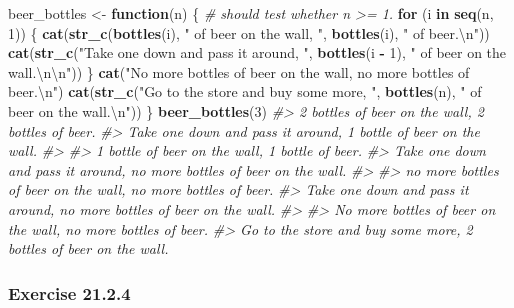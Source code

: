 \documentclass[]{book}
\newenvironment{Shaded}{\begin{snugshade}}{\end{snugshade}}
\newcommand{\CharTok}[1]{\textcolor[rgb]{0.31,0.60,0.02}{#1}}
\newcommand{\CommentTok}[1]{\textcolor[rgb]{0.56,0.35,0.01}{\textit{#1}}}
\newcommand{\ControlFlowTok}[1]{\textcolor[rgb]{0.13,0.29,0.53}{\textbf{#1}}}
\newcommand{\DecValTok}[1]{\textcolor[rgb]{0.00,0.00,0.81}{#1}}
\newcommand{\KeywordTok}[1]{\textcolor[rgb]{0.13,0.29,0.53}{\textbf{#1}}}
\newcommand{\NormalTok}[1]{#1}
\newcommand{\OperatorTok}[1]{\textcolor[rgb]{0.81,0.36,0.00}{\textbf{#1}}}
\newcommand{\StringTok}[1]{\textcolor[rgb]{0.31,0.60,0.02}{#1}}
\theoremstyle{plain}
\theoremstyle{remark}
\theoremstyle{definition}
\theoremstyle{definition}
\theoremstyle{definition}
\theoremstyle{remark}
\begin{document}
\begin{enumerate}
\begin{Shaded}
\begin{Highlighting}[]
\NormalTok{beer_bottles <-}\StringTok{ }\ControlFlowTok{function}\NormalTok{(n) \{}
  \CommentTok{# should test whether n >= 1.}
  \ControlFlowTok{for}\NormalTok{ (i }\ControlFlowTok{in} \KeywordTok{seq}\NormalTok{(n, }\DecValTok{1}\NormalTok{)) \{}
     \KeywordTok{cat}\NormalTok{(}\KeywordTok{str_c}\NormalTok{(}\KeywordTok{bottles}\NormalTok{(i), }\StringTok{" of beer on the wall, "}\NormalTok{, }\KeywordTok{bottles}\NormalTok{(i), }\StringTok{" of beer.}\CharTok{\textbackslash{}n}\StringTok{"}\NormalTok{))}
     \KeywordTok{cat}\NormalTok{(}\KeywordTok{str_c}\NormalTok{(}\StringTok{"Take one down and pass it around, "}\NormalTok{, }\KeywordTok{bottles}\NormalTok{(i }\OperatorTok{-}\StringTok{ }\DecValTok{1}\NormalTok{),}
                \StringTok{" of beer on the wall.}\CharTok{\textbackslash{}n\textbackslash{}n}\StringTok{"}\NormalTok{))}
\NormalTok{  \}}
  \KeywordTok{cat}\NormalTok{(}\StringTok{"No more bottles of beer on the wall, no more bottles of beer.}\CharTok{\textbackslash{}n}\StringTok{"}\NormalTok{)}
  \KeywordTok{cat}\NormalTok{(}\KeywordTok{str_c}\NormalTok{(}\StringTok{"Go to the store and buy some more, "}\NormalTok{, }\KeywordTok{bottles}\NormalTok{(n), }\StringTok{" of beer on the wall.}\CharTok{\textbackslash{}n}\StringTok{"}\NormalTok{))}
\NormalTok{\}}
\KeywordTok{beer_bottles}\NormalTok{(}\DecValTok{3}\NormalTok{)}
\CommentTok{#> 2 bottles of beer on the wall, 2 bottles of beer.}
\CommentTok{#> Take one down and pass it around, 1 bottle of beer on the wall.}
\CommentTok{#> }
\CommentTok{#> 1 bottle of beer on the wall, 1 bottle of beer.}
\CommentTok{#> Take one down and pass it around, no more bottles of beer on the wall.}
\CommentTok{#> }
\CommentTok{#> no more bottles of beer on the wall, no more bottles of beer.}
\CommentTok{#> Take one down and pass it around, no more bottles of beer on the wall.}
\CommentTok{#> }
\CommentTok{#> No more bottles of beer on the wall, no more bottles of beer.}
\CommentTok{#> Go to the store and buy some more, 2 bottles of beer on the wall.}
\end{Highlighting}
\end{Shaded}
\end{enumerate}

\hypertarget{exercise-21.2.4}{%
\subsubsection*{\texorpdfstring{Exercise
{21.2.4}}{Exercise 21.2.4}}\label{exercise-21.2.4}}
\end{document}

